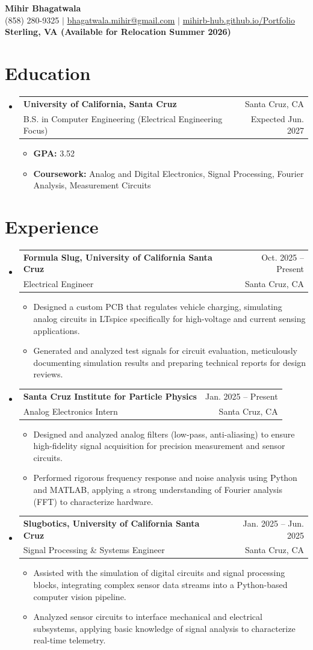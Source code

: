 \documentclass[letterpaper,11pt]{article}
\makeatletter
\newcommand{\resumeItem}[1]{\item{#1}}
\newcommand{\resumeSubheading}[4]{
  \item
    \begin{tabular*}{0.97\textwidth}[t]{l@{\extracolsep{\fill}}r}
      \textbf{#1} & #2 \\
      #3 & #4 \\
    \end{tabular*}
}
\newcommand{\resumeSubHeadingListStart}{\begin{itemize}[label=\textbullet]}
\newcommand{\resumeSubHeadingListEnd}{\end{itemize}}
\newcommand{\resumeItemListStart}{\begin{itemize}[label=-]}
\newcommand{\resumeItemListEnd}{\end{itemize}}
\makeatother
\begin{document}
\begin{center}
  {\Large\bfseries Mihir Bhagatwala} \\
  {(858) 280-9325 $\vert$ \href{mailto:bhagatwala.mihir@gmail.com}{bhagatwala.mihir@gmail.com} $\vert$ \href{https://mihirb-hub.github.io/Portfolio/}{mihirb-hub.github.io/Portfolio}} \\
  {\textbf{Sterling, VA (Available for Relocation Summer 2026)}}
\end{center}

\section{Education}
\resumeSubHeadingListStart
  \resumeSubheading{University of California, Santa Cruz}{Santa Cruz, CA}{B.S. in Computer Engineering (Electrical Engineering Focus)}{Expected Jun. 2027}
  \resumeItemListStart
    \resumeItem{\textbf{GPA:} 3.52}
    \resumeItem{\textbf{Coursework:} Analog and Digital Electronics, Signal Processing, Fourier Analysis, Measurement Circuits}
  \resumeItemListEnd
\resumeSubHeadingListEnd

\section{Experience}
\resumeSubHeadingListStart
  \resumeSubheading{Formula Slug, University of California Santa Cruz}{Oct. 2025 -- Present}{Electrical Engineer}{Santa Cruz, CA}
  \resumeItemListStart
    \resumeItem{Designed a custom PCB that regulates vehicle charging, simulating analog circuits in LTspice specifically for high-voltage and current sensing applications.}
    \resumeItem{Generated and analyzed test signals for circuit evaluation, meticulously documenting simulation results and preparing technical reports for design reviews.}
  \resumeItemListEnd

  \resumeSubheading{Santa Cruz Institute for Particle Physics}{Jan. 2025 -- Present}{Analog Electronics Intern}{Santa Cruz, CA}
  \resumeItemListStart
    \resumeItem{Designed and analyzed analog filters (low-pass, anti-aliasing) to ensure high-fidelity signal acquisition for precision measurement and sensor circuits.}
    \resumeItem{Performed rigorous frequency response and noise analysis using Python and MATLAB, applying a strong understanding of Fourier analysis (FFT) to characterize hardware.}
  \resumeItemListEnd

  \resumeSubheading{Slugbotics, University of California Santa Cruz}{Jan. 2025 -- Jun. 2025}{Signal Processing \& Systems Engineer}{Santa Cruz, CA}
  \resumeItemListStart
    \resumeItem{Assisted with the simulation of digital circuits and signal processing blocks, integrating complex sensor data streams into a Python-based computer vision pipeline.}
    \resumeItem{Analyzed sensor circuits to interface mechanical and electrical subsystems, applying basic knowledge of signal analysis to characterize real-time telemetry.}
  \resumeItemListEnd
\resumeSubHeadingListEnd
\end{document}
